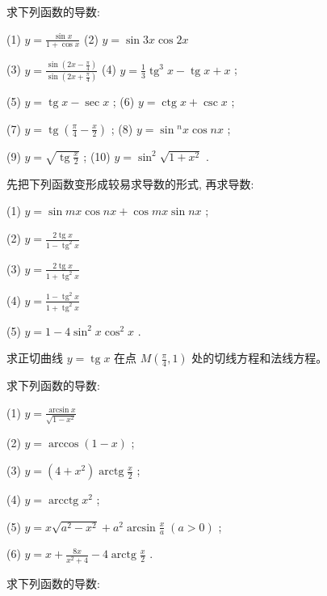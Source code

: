 \documentclass[lang=cn,newtx,10pt,scheme=chinese]{elegantbook}
\begin{document}
\begin{problemset}[习 题 六]

\item 求下列函数的导数:

(1) \(y = \frac{\sin x}{1 + \cos x}\) (2) \(y = \sin {3x}\cos {2x}\)

(3) \(y = \frac{\sin \left( {{2x} - \frac{\pi }{4}}\right) }{\sin \left( {{2x} + \frac{\pi }{4}}\right) }\) (4) \(y = \frac{1}{3}{\operatorname{tg}}^{3}x - \operatorname{tg}x + x\) ;

(5) \(y = \operatorname{tg}x - \sec x\) ; (6) \(y = \operatorname{ctg}x + \csc x\) ;

(7) \(y = \operatorname{tg}\left( {\frac{\pi }{4} - \frac{x}{2}}\right)\) ; (8) \(y = \sin {}^{n}x\cos {nx}\) ;

(9) \(y = \sqrt{\operatorname{tg}\frac{x}{2}}\) ; (10) \(y = {\sin }^{2}\sqrt{1 + {x}^{2}}\) .

\item 先把下列函数变形成较易求导数的形式, 再求导数:

(1) \(y = \sin {mx}\cos {nx} + \cos {mx}\sin {nx}\) ;

(2) \(y = \frac{2\operatorname{tg}x}{1 - {\operatorname{tg}}^{2}x}\)

(3) \(y = \frac{2\operatorname{tg}x}{1 + {\operatorname{tg}}^{2}x}\)

(4) \(y = \frac{1 - {\operatorname{tg}}^{2}x}{1 + {\operatorname{tg}}^{2}x}\)

(5) \(y = 1 - 4{\sin }^{2}x{\cos }^{2}x\) .

\item 求正切曲线 \(y = \operatorname{tg}x\) 在点 \(M\left( {\frac{\pi }{4},1}\right)\) 处的切线方程和法线方程。

\item 求下列函数的导数:

(1) \(y = \frac{\arcsin x}{\sqrt{1 - {x}^{2}}}\)

(2) \(y = \arccos \left( {1 - x}\right)\) ;

(3) \(y = \left( {4 + {x}^{2}}\right) \operatorname{arctg}\frac{x}{2}\) ;

(4) \(y = \operatorname{arcctg}{x}^{2}\) ;

(5) \(y = x\sqrt{{a}^{2} - {x}^{2}} + {a}^{2}\arcsin \frac{x}{a}\;\left( {a > 0}\right)\) ;

(6) \(y = x + \frac{8x}{{x}^{2} + 4} - 4\operatorname{arctg}\frac{x}{2}\) .

\item 求下列函数的导数:


\end{problemset}
\end{document}
